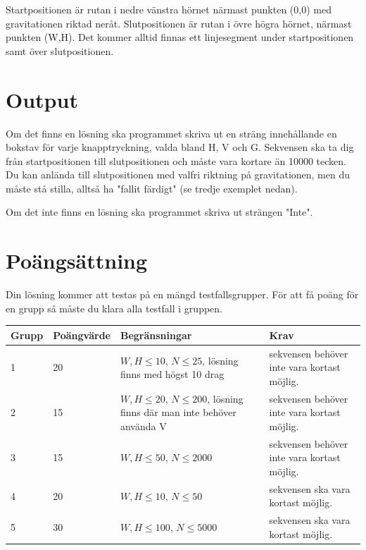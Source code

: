 Startpositionen är rutan i nedre vänstra hörnet närmast punkten (0,0) med gravitationen riktad neråt. Slutpositionen är rutan i övre högra hörnet, närmast punkten (W,H). Det kommer alltid finnas ett linjesegment under startpositionen samt över slutpositionen.


\section*{Output}

Om det finns en lösning ska programmet skriva ut en sträng innehållande en bokstav för varje knapptryckning, valda bland H, V och G. Sekvensen ska ta dig från startpositionen till slutpositionen och måste vara kortare än 10000 tecken. Du kan anlända till slutpositionen med valfri riktning på gravitationen, men du måste stå stilla, alltså ha "fallit färdigt" (se tredje exemplet nedan).

Om det inte finns en lösning ska programmet skriva ut strängen "Inte".

\section*{Poängsättning}
Din lösning kommer att testas på en mängd testfallsgrupper. För att få poäng för en grupp så måste du klara alla testfall i gruppen.

\begin{tabular}{| l | l | p{5cm} | p{5cm} |}
	\hline
	Grupp & Poängvärde & Begränsningar & Krav \\ \hline
  1     & 20  & $W,H \le 10$, $N \le 25$, lösning finns med högst 10 drag & sekvensen behöver inte vara kortast möjlig. \\ \hline
  2     & 15  & $W,H \le 20$, $N \le 200$, lösning finns där man inte behöver använda V & sekvensen behöver inte vara kortast möjlig. \\ \hline
  3     & 15  & $W,H \le 50$, $N \le 2000$ & sekvensen behöver inte vara kortast möjlig. \\ \hline
  4     & 20  & $W,H \le 10$, $N \le 50$ & sekvensen ska vara kortast möjlig. \\ \hline
  5     & 30  & $W,H \le 100$, $N \le 5000$ & sekvensen ska vara kortast möjlig. \\ \hline
\end{tabular}

